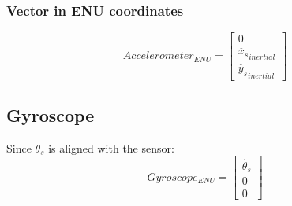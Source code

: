 \documentclass[titlepage]{article}
\numberwithin{equation}{section}
\begin{document}
\subsubsection{Vector in ENU coordinates}
\begin{equation}
Accelerometer_{ENU} = \left[ \begin{array}{c}
0 \\
\ddot{x_s}_{inertial} \\
\ddot{y_s}_{inertial}
\end{array} \right]
\end{equation}

\subsection{Gyroscope}
Since $\theta_s$ is aligned with the sensor:
\begin{equation}
Gyroscope_{ENU} = \left[ \begin{array}{c}
\dot{\theta_s} \\
0 \\
0
\end{array} \right]
\end{equation}
\end{document}
